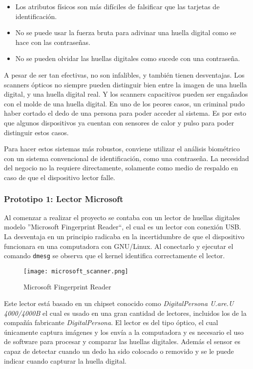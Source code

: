 \begin{itemize}
 \item Los atributos físicos son más difíciles de falsificar que las tarjetas de identificación.
 \item No se puede usar la fuerza bruta para adivinar una huella digital como se hace con las contraseñas.
 \item No se pueden olvidar las huellas digitales como sucede con una contraseña.
\end{itemize}

A pesar de ser tan efectivas, no son infalibles, y también tienen desventajas. Los scanners ópticos no siempre pueden distinguir bien entre la imagen de una huella digital, y una huella digital real. Y los scanners capacitivos pueden ser engañados con el molde de una huella digital. En uno de los peores casos, un criminal pudo haber cortado el dedo de una persona para poder acceder al sistema. Es por esto que algunos dispositivos ya cuentan con sensores de calor y pulso para poder distinguir estos casos.

Para hacer estos sistemas más robustos, conviene utilizar el análisis biométrico con un sistema convencional de identificación, como una contraseña. La necesidad del negocio no la requiere directamente, solamente como medio de respaldo en caso de que el dispositivo lector falle.

\subsubsection{Prototipo 1: Lector Microsoft}
\label{sec:lector_microsoft}

Al comenzar a realizar el proyecto se contaba con un lector de huellas digitales modelo ''Microsoft Fingerprint Reader``, el cual es un lector con conexión USB. La desventaja en un principio radicaba en la incertidumbre de que el dispositivo funcionara en una computadora con GNU/Linux. Al conectarlo y ejecutar el comando \texttt{dmesg} se observa que el kernel identifica correctamente el lector.

\begin{figure}[htb]
 \begin{center}
  \texttt{[image: microsoft\_scanner.png]}
 \end{center}
 \caption{Microsoft Fingerprint Reader}
 \label{fig:finger_print_2}
\end{figure}

Este lector está basado en un chipset conocido como \textit{DigitalPersona U.are.U 4000/4000B} el cual es usado en una gran cantidad de lectores, incluidos los de la compañía fabricante \textit{DigitalPersona}. El lector es del tipo óptico, el cual únicamente captura imágenes y los envía a la computadora y es necesario el uso de software para procesar y comparar las huellas digitales. Además el sensor es capaz de detectar cuando un dedo ha sido colocado o removido y se le puede indicar cuando capturar la huella digital.

